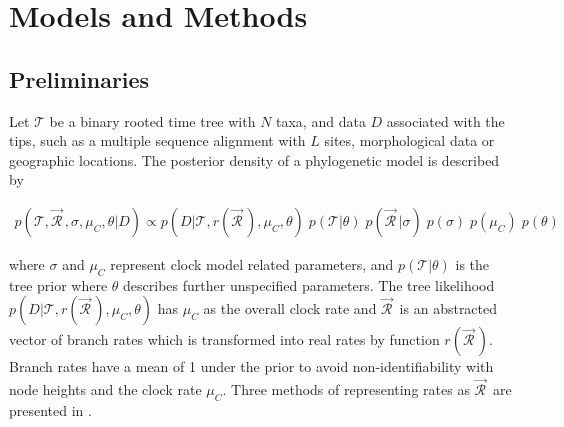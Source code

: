 \documentclass[10pt,letterpaper]{article}
\begin{document}







\section*{Models and Methods} \label{sect:models}



\subsection*{Preliminaries}



Let $\mathcal{T}$ be a binary rooted time tree with $N$ taxa, and %
data $D$ associated with the tips, such as a multiple sequence alignment with $L$ sites, morphological data or geographic locations. 
The posterior density of a phylogenetic model is described by

\begin{eqnarray}
\label{eq:bayesian}
p(\mathcal{T}, \vec{\mathcal{R}}^{\,}, \sigma, \mu_C, \theta|D) \propto  p(D|\mathcal{T}, r(\vec{\mathcal{R}}^{\,}), \mu_C, \theta) \; p(\mathcal{T}|\theta) \;  p(\vec{\mathcal{R}}^{\,} | \sigma) \; p(\sigma) \; p(\mu_C) \; p(\theta)
\end{eqnarray}

\noindent
where $\sigma$ and $\mu_C$ represent clock model related parameters, and $p(\mathcal{T}|\theta)$ is the tree prior where $\theta$ describes further unspecified parameters. 
The tree likelihood $p(D|\mathcal{T}, r(\vec{\mathcal{R}}^{\,}), \mu_C,\theta)$ %
has $\mu_C$ as the overall clock rate and
$\vec{\mathcal{R}}^{\,}$ is an abstracted vector of branch rates which is transformed into real rates by function $r(\vec{\mathcal{R}}^{\,})$. 
Branch rates have a mean of 1 under the prior to avoid non-identifiability with node heights and the clock rate $\mu_C$.
Three methods of representing rates as $\vec{\mathcal{R}}^{\,}$ are presented in \textbf{}.  
\end{document}
